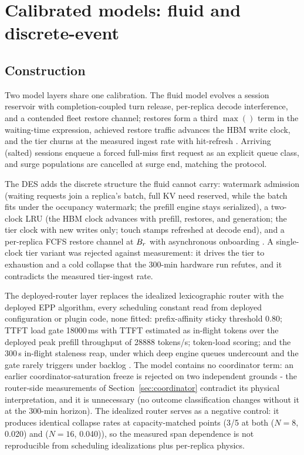 \section{Calibrated models: fluid and discrete-event}
\label{sec:models}

\subsection{Construction}
\label{sec:construction}

Two model layers share one calibration. The fluid model evolves a
session reservoir with completion-coupled turn release, per-replica
decode interference, and a contended fleet restore channel; restores
form a third $\max()$ term in the waiting-time expression, achieved
restore traffic advances the HBM write clock, and the tier churns at
the measured ingest rate with hit-refresh . Arriving (salted)
sessions enqueue a forced full-miss first request as an explicit
queue class, and surge populations are cancelled at surge end,
matching the protocol.

The DES adds the discrete structure the fluid cannot carry:
watermark admission (waiting requests join a replica's batch, full
KV need reserved, while the batch fits under the occupancy
watermark; the prefill engine stays serialized), a two-clock LRU
(the HBM clock advances with prefill, restores, and generation; the
tier clock with new writes only; touch stamps refreshed at decode
end), and a per-replica FCFS restore channel at $B_r$ with
asynchronous onboarding . A single-clock tier variant was
rejected against measurement: it drives the tier to exhaustion and a
cold collapse that the 300-min hardware run refutes, and it
contradicts the measured tier-ingest rate.

The deployed-router layer replaces the idealized lexicographic
router with the deployed EPP algorithm, every scheduling constant
read from deployed configuration or plugin code, none fitted:
prefix-affinity sticky threshold 0.80; TTFT load gate 18000\,ms with
TTFT estimated as in-flight tokens over the deployed peak prefill
throughput of 28888 tokens/s; token-load scoring; and the 300\,s
in-flight staleness reap, under which deep engine queues undercount
and the gate rarely triggers under backlog . The model contains
no coordinator term: an earlier coordinator-saturation freeze is
rejected on two independent grounds - the router-side measurements
of Section~\ref{sec:coordinator} contradict its physical interpretation, and it is
unnecessary (no outcome classification changes without it at the
300-min horizon). The idealized router serves as a negative control:
it produces identical collapse rates at capacity-matched points
(3/5 at both ($N{=}8$, 0.020) and ($N{=}16$, 0.040)), so the measured span
dependence is not reproducible from scheduling idealizations plus
per-replica physics.

